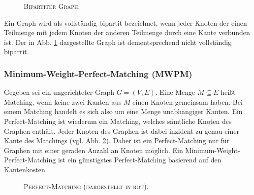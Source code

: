 \begin{figure}[H]
\centering
{}
\caption{\textsc{Bipartiter Graph.}}
\label{fig:digression_bipartite_graph}
\end{figure}

Ein Graph wird als vollständig bipartit bezeichnet, wenn jeder Knoten der einen Teilmenge mit jedem Knoten
der anderen Teilmenge durch eine Kante verbunden ist. Der in Abb. \ref{fig:digression_bipartite_graph}
dargestellte Graph ist dementsprechend nicht vollständig bipartit.

\subsubsection{Minimum-Weight-Perfect-Matching (\textsc{MWPM})}
\label{sec:digression_mwpm}

Gegeben sei ein ungerichteter Graph $G = (V, E)$. Eine Menge $M \subseteq E$ heißt Matching,
wenn keine zwei Kanten aus $M$ einen Knoten gemeinsam haben. Bei einem Matching handelt es sich also
um eine Menge unabhängiger Kanten. Ein Perfect-Matching ist wiederum ein Matching, welches sämtliche Knoten des Graphen enthält.
Jeder Knoten des Graphen ist dabei inzident zu genau einer Kante des Matchings (vgl. Abb. \ref{fig:perfect_matching}).
Daher ist ein Perfect-Matching nur für Graphen mit einer geraden Anzahl an Knoten möglich.
Ein Minimum-Weight-Perfect-Matching ist ein günstigstes Perfect-Matching basierend auf den Kantenkosten.
\begin{figure}[H]
\centering
{}
\caption{\textsc{Perfect-Matching (dargestellt in rot).}}
\label{fig:perfect_matching}
\end{figure}


